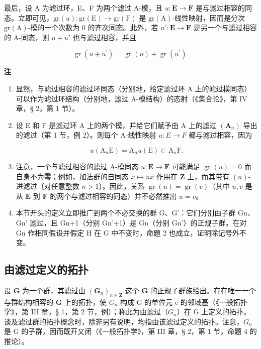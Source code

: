 最后，设 A 为滤过环，E、F 为两个滤过 A-模，且 \(u: \mathbf{E} \to \mathbf{F}\) 是与滤过相容的同态。立即可见，\(\mathrm{gr}(u): \mathrm{gr}(\mathrm{E}) \to \mathrm{gr}(\mathrm{F})\) 是 \(\mathrm{gr}(\mathrm{A})\)-线性映射，因而是分次 \(\mathrm{gr}(\mathrm{A})\)-模的一个次数为 0 的齐次同态。此外，若 \(u': \mathbf{E} \to \mathbf{F}\) 是另一个与滤过相容的 A-同态，则 \(u + u'\) 也与滤过相容，并且

\[
\operatorname{gr} (u + u ^ {\prime}) = \operatorname{gr} (u) + \operatorname{gr} (u ^ {\prime}).\tag{14}
\]

\textbf{注}\par

\begin{enumerate}
\def\labelenumi{(\arabic{enumi})}
\item
  显然，与滤过相容的滤过环同态（分别地，给定滤过环 A 上的滤过模同态）可以作为滤过环结构（分别地，滤过 A-模结构）的态射（《集合论》，第 IV 章，§ 2，第 1 节）。
\item
  设 E 和 F 是滤过环 A 上的两个模，并给它们赋予由 A 上的滤过 \((\mathbf{A}_{n})\) 导出的滤过（第 1 节，例 2）。则每个 A-线性映射 \(u: E \rightarrow F\) 都与滤过相容，因为

\[
u (\mathrm{A} _ {n} \mathrm{E}) = \mathrm{A} _ {n} u (\mathrm{E}) \subset \mathrm{A} _ {n} \mathrm{F}.
\]

\item
	  注意，一个与滤过相容的滤过 A-模同态 \(u: \mathbf{E} \to \mathbf{F}\) 可能满足 \(\operatorname{gr}(u) = 0\) 而自身不为零；例如，加法群的自同态 \(x \mapsto nx\) 作用在 \(\mathbf{Z}\) 上，而其带有 \((n)\)-进滤过（对任意整数 \(n > 1\)）。因此，关系 \(\operatorname{gr}(u) = \operatorname{gr}(v)\)（其中 \(u, v\) 是从 \(\mathbf{E}\) 到 \(\mathbf{F}\) 的两个与滤过相容的同态）并不必然推出 \(u = v\)。
\item
  本节开头的定义立即推广到两个不必交换的群 G、G'：它们分别由子群 Gn、Gn' 滤过，且 Gn+1（分别 Gn'+1）是 Gn（分别 Gn'）的正规子群。在对 Gn 作相同假设并假定 H 在 G 中不变时，命题 2 也成立，证明除记号外不变。
\end{enumerate}

\subsection{由滤过定义的拓扑}

设 \(\mathbf{G}\) 为一个群，其滤过由 \((\mathbf{G}_n)_{n\in \mathbf{Z}}\) 这个 \(\mathbf{G}\) 的正规子群族给出。存在唯一一个与群结构相容的 \(\mathbf{G}\) 上的拓扑，使 \(G_{n}\) 构成 G 的单位元 e 的邻域基（《一般拓扑学》，第 III 章，§ 1，第 2 节，例）；称此为由滤过（\(G_{n}\)）在 G 上定义的拓扑。谈及滤过群的拓扑概念时，除非另有说明，均指由该滤过定义的拓扑。注意，\(G_{n}\) 是 G 的子群，因而既开又闭（《一般拓扑学》，第 III 章，§ 2，第 1 节，命题 4 的推论）。

